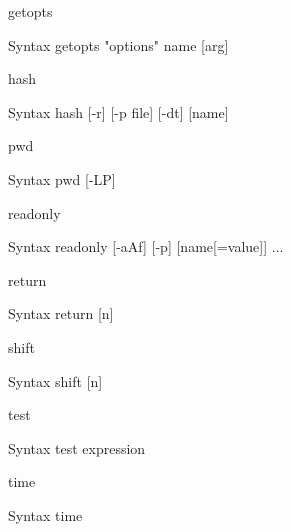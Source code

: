 \documentclass[10pt, compress, aspectratio=169]{beamer}
\begin{document}
\begin{frame}{getopts}
  \begin{alertblock}{Syntax}
    getopts "options" name [arg]
  \end{alertblock}
  
\end{frame}

\begin{frame}{hash}
  \begin{alertblock}{Syntax}
    hash [-r] [-p file] [-dt] [name]
  \end{alertblock}
\end{frame}

\begin{frame}{pwd}
  \begin{alertblock}{Syntax}
    pwd [-LP]
  \end{alertblock}
\end{frame}

\begin{frame}{readonly}
  \begin{alertblock}{Syntax}
    readonly [-aAf] [-p] [name[=value]] ...
  \end{alertblock}
\end{frame}

\begin{frame}{return}
  \begin{alertblock}{Syntax}
    return [n]
  \end{alertblock}
\end{frame}

\begin{frame}{shift}
  \begin{alertblock}{Syntax}
    shift [n]
  \end{alertblock}
\end{frame}

\begin{frame}{test}
  \begin{alertblock}{Syntax}
    test expression
  \end{alertblock}
\end{frame}

\begin{frame}{time}
  \begin{alertblock}{Syntax}
    time
  \end{alertblock}
\end{frame}
\end{document}
